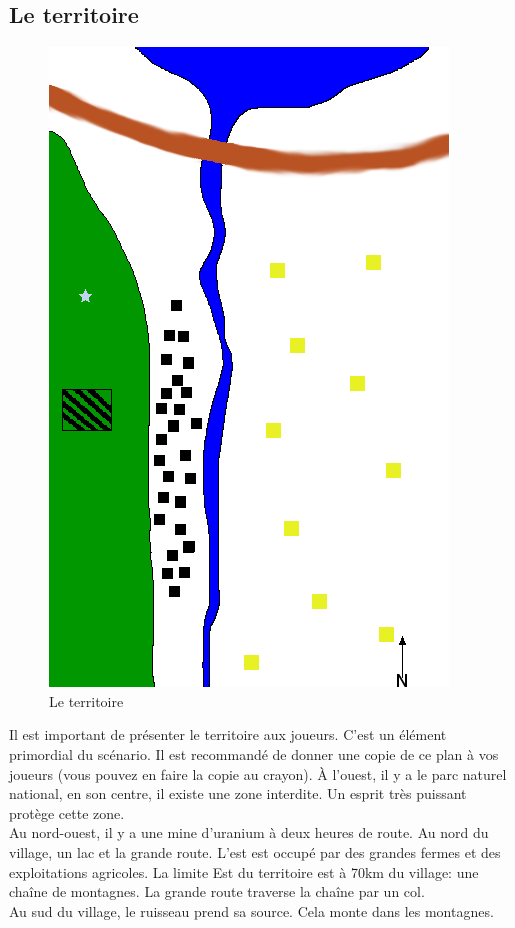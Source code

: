 \documentclass[oneside,12pt]{book}
\begin{document}
\begin{flushleft}
\subsection{Le territoire}
\begin{figure}[!ht]
\caption{\label{territoire} Le territoire}
\includegraphics[scale=0.8]{plan.png}
\end{figure}
Il est important de présenter le territoire aux joueurs. C'est un élément primordial du scénario. 
Il est recommandé de donner une copie de ce plan à vos joueurs (vous pouvez en faire la copie au crayon). 
À l'ouest, il y a le parc naturel national, en son centre, il existe une zone interdite. 
Un esprit très puissant protège cette zone.\\
Au nord-ouest, il y a une mine d'uranium à deux heures de route. Au nord du village, un lac et la grande route. 
L'est est occupé par des grandes fermes et des exploitations agricoles. 
La limite Est du territoire est à 70km du village: une chaîne de montagnes.  
La grande route traverse la chaîne par un col. \\
Au sud du village, le ruisseau prend sa source. Cela monte dans les montagnes. \\


\end{flushleft}
\end{document}

